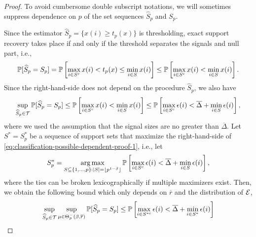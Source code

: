 \begin{proof}
To avoid cumbersome double subscript notations, we will sometimes suppress dependence on $p$ of the set sequences $\widehat{S}_p$ and $S_p$.

Since the estimator $\widehat{S}_p = \{x(i) \ge t_p(x)\}$ is thresholding, exact support recovery takes place if and only if the threshold separates the signals and null part, i.e.,
\begin{equation*}
    \P[\widehat{S}_p = S_p] 
    = \P\left[\max_{i\in S^c}x(i) < t_p(x) \le \min_{i\in S}x(i)\right]
    \le \P\left[\max_{i\in S^c}x(i) < \min_{i\in S}x(i)\right].
\end{equation*}
Since the right-hand-side does not depend on the procedure $\widehat{S}_p$, we also have
\begin{equation} \label{eq:classification-possible-dependent-proof-1}
    \sup_{\widehat{S}_p\in{\cal T}} \P[\widehat{S}_p = S_p] 
    \le \P\left[\max_{i\in S^c}x(i) < \min_{i\in S}x(i)\right]
    \le \P\left[{\max_{i\in S^c}\epsilon(i)} < {\overline{\Delta} + \min_{i\in S}\epsilon(i)}\right],
\end{equation}
where we used the assumption that the signal sizes are no greater than $\overline{\Delta}$.
Let $S^* = S_p^*$ be a sequence of support sets that maximize the right-hand-side of \eqref{eq:classification-possible-dependent-proof-1}, i.e., let
$$
S_p^* = \argmax_{S\subseteq\{1,\ldots,p\}:|S| = \lfloor p^{1-\beta}\rfloor} \P\left[{\max_{i\in S^c}\epsilon(i)} < {\overline{\Delta} + \min_{i\in S}\epsilon(i)}\right],
$$
where the ties can be broken lexicographically if multiple maximizers exist.
Then,
we obtain the following bound which only depends on $\overline{r}$ and the distribution of ${\cal E}$,
\begin{align}
    \sup_{\widehat{S}_p\in{\cal T}} \sup_{\mu\in\Theta^-_p(\beta,\overline{r})} \P[\widehat{S}_p = S_p] 
    &\le \P\left[{\max_{i\in S^{*c}}\epsilon(i)} < {\overline{\Delta} + \min_{i\in S^*}\epsilon(i)}\right] \nonumber \\

\end{align}
\end{proof}
